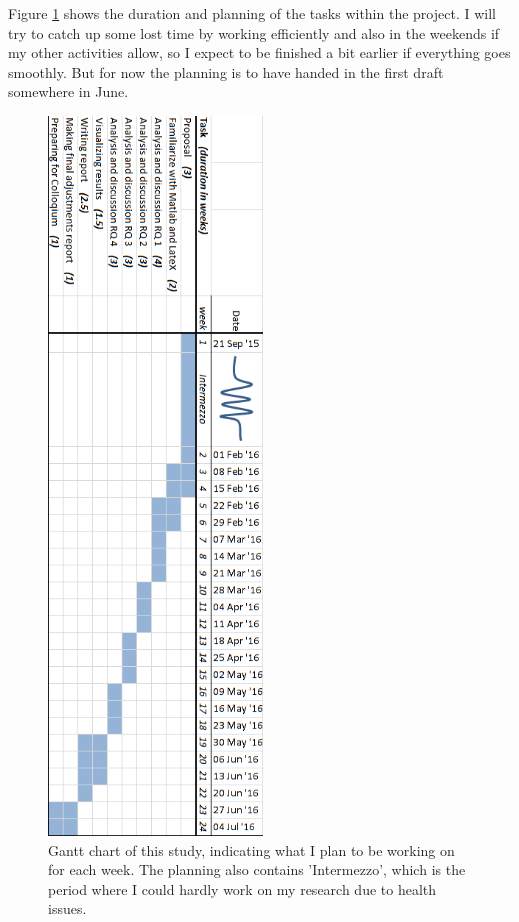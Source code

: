 \documentclass{article}
\begin{document}
Figure \ref{fig:planning} shows the duration and planning of the tasks within the project. I will try to catch up some lost time by working efficiently and also in the weekends if my other activities allow, so I expect to be finished a bit earlier if everything goes smoothly. But for now the planning is to have handed in the first draft somewhere in June.

\begin{figure}[H]
	\centering
	\includegraphics[height=7.5in]{Planning.png}
	\caption[Optional caption]{Gantt chart of this study, indicating what I plan to be working on for each week. The planning also contains 'Intermezzo', which is the period where I could hardly work on my research due to health issues.}
	\label{fig:planning}
\end{figure}


\newpage
\end{document}
